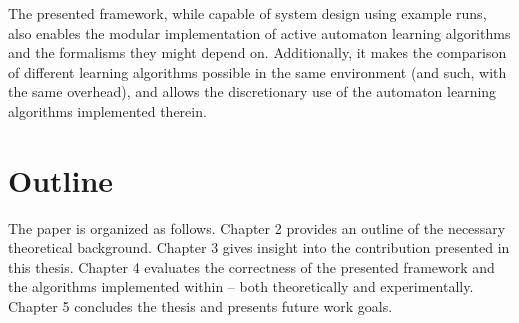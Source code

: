 The presented framework, while capable of system design using example runs, also enables the modular implementation of active automaton learning algorithms and the formalisms they might depend on. Additionally, it makes the comparison of different learning algorithms possible in the same environment (and such, with the same overhead), and allows the discretionary use of the automaton learning algorithms implemented therein.

\section{Outline}

The paper is organized as follows. Chapter 2 provides an outline of the necessary theoretical background. Chapter 3 gives insight into the contribution presented in this thesis. Chapter 4 evaluates the correctness of the presented framework and the algorithms implemented within -- both theoretically and experimentally. Chapter 5 concludes the thesis and presents future work goals.

